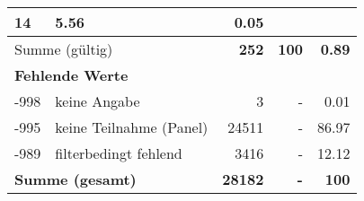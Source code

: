 \begin{longtable}{lXrrr}
       \num{14} &
       \num[round-mode=places,round-precision=2]{5,56} &
         \num[round-mode=places,round-precision=2]{0,05} \\
     \midrule
     \multicolumn{2}{l}{Summe (gültig)} &
       \textbf{\num{252}} &
     \textbf{100} &
       \textbf{\num[round-mode=places,round-precision=2]{0,89}} \\
     \multicolumn{5}{l}{\textbf{Fehlende Werte}}\\
       -998 &
       keine Angabe &
         \num{3} &
        - &
         \num[round-mode=places,round-precision=2]{0,01} \\
       -995 &
       keine Teilnahme (Panel) &
         \num{24511} &
        - &
         \num[round-mode=places,round-precision=2]{86,97} \\
       -989 &
       filterbedingt fehlend &
         \num{3416} &
        - &
         \num[round-mode=places,round-precision=2]{12,12} \\
     \midrule
     \multicolumn{2}{l}{\textbf{Summe (gesamt)}} &
          \textbf{\num{28182}} &
        \textbf{-} &
        \textbf{100} \\
     \bottomrule
     \end{longtable}
     
